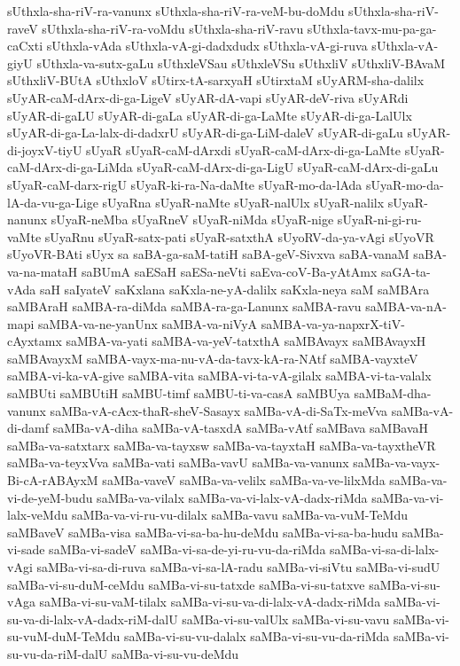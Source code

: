 {sUthxla-sha-riV-ra-vanunx
sUthxla-sha-riV-ra-veM-bu-doMdu
sUthxla-sha-riV-raveV
sUthxla-sha-riV-ra-voMdu
sUthxla-sha-riV-ravu
sUthxla-tavx-mu-pa-ga-caCxti
sUthxla-vAda
sUthxla-vA-gi-dadxdudx
sUthxla-vA-gi-ruva
sUthxla-vA-giyU
sUthxla-va-sutx-gaLu
sUthxleVSau
sUthxleVSu
sUthxliV
sUthxliV-BAvaM
sUthxliV-BUtA
sUthxloV
sUtirx-tA-sarxyaH
sUtirxtaM
sUyARM-sha-dalilx
sUyAR-caM-dArx-di-ga-LigeV
sUyAR-dA-vapi
sUyAR-deV-riva
sUyARdi
sUyAR-di-gaLU
sUyAR-di-gaLa
sUyAR-di-ga-LaMte
sUyAR-di-ga-LalUlx
sUyAR-di-ga-La-lalx-di-dadxrU
sUyAR-di-ga-LiM-daleV
sUyAR-di-gaLu
sUyAR-di-joyxV-tiyU
sUyaR
sUyaR-caM-dArxdi
sUyaR-caM-dArx-di-ga-LaMte
sUyaR-caM-dArx-di-ga-LiMda
sUyaR-caM-dArx-di-ga-LigU
sUyaR-caM-dArx-di-gaLu
sUyaR-caM-darx-rigU
sUyaR-ki-ra-Na-daMte
sUyaR-mo-da-lAda
sUyaR-mo-da-lA-da-vu-ga-Lige
sUyaRna
sUyaR-naMte
sUyaR-nalUlx
sUyaR-nalilx
sUyaR-nanunx
sUyaR-neMba
sUyaRneV
sUyaR-niMda
sUyaR-nige
sUyaR-ni-gi-ru-vaMte
sUyaRnu
sUyaR-satx-pati
sUyaR-satxthA
sUyoRV-da-ya-vAgi
sUyoVR
sUyoVR-BAti
sUyx
sa
saBA-ga-saM-tatiH
saBA-geV-Sivxva
saBA-vanaM
saBA-va-na-mataH
saBUmA
saESaH
saESa-neVti
saEva-coV-Ba-yAtAmx
saGA-ta-vAda
saH
saIyateV
saKxlana
saKxla-ne-yA-dalilx
saKxla-neya
saM
saMBAra
saMBAraH
saMBA-ra-diMda
saMBA-ra-ga-Lanunx
saMBA-ravu
saMBA-va-nA-mapi
saMBA-va-ne-yanUnx
saMBA-va-niVyA
saMBA-va-ya-napxrX-tiV-cAyxtamx
saMBA-va-yati
saMBA-va-yeV-tatxthA
saMBAvayx
saMBAvayxH
saMBAvayxM
saMBA-vayx-ma-nu-vA-da-tavx-kA-ra-NAtf
saMBA-vayxteV
saMBA-vi-ka-vA-give
saMBA-vita
saMBA-vi-ta-vA-gilalx
saMBA-vi-ta-valalx
saMBUti
saMBUtiH
saMBU-timf
saMBU-ti-va-casA
saMBUya
saMBaM-dha-vanunx
saMBa-vA-cAcx-thaR-sheV-Sasayx
saMBa-vA-di-SaTx-meVva
saMBa-vA-di-damf
saMBa-vA-diha
saMBa-vA-tasxdA
saMBa-vAtf
saMBava
saMBavaH
saMBa-va-satxtarx
saMBa-va-tayxsw
saMBa-va-tayxtaH
saMBa-va-tayxtheVR
saMBa-va-teyxVva
saMBa-vati
saMBa-vavU
saMBa-va-vanunx
saMBa-va-vayx-Bi-cA-rABAyxM
saMBa-vaveV
saMBa-va-velilx
saMBa-va-ve-lilxMda
saMBa-va-vi-de-yeM-budu
saMBa-va-vilalx
saMBa-va-vi-lalx-vA-dadx-riMda
saMBa-va-vi-lalx-veMdu
saMBa-va-vi-ru-vu-dilalx
saMBa-vavu
saMBa-va-vuM-TeMdu
saMBaveV
saMBa-visa
saMBa-vi-sa-ba-hu-deMdu
saMBa-vi-sa-ba-hudu
saMBa-vi-sade
saMBa-vi-sadeV
saMBa-vi-sa-de-yi-ru-vu-da-riMda
saMBa-vi-sa-di-lalx-vAgi
saMBa-vi-sa-di-ruva
saMBa-vi-sa-lA-radu
saMBa-vi-siVtu
saMBa-vi-sudU
saMBa-vi-su-duM-ceMdu
saMBa-vi-su-tatxde
saMBa-vi-su-tatxve
saMBa-vi-su-vAga
saMBa-vi-su-vaM-tilalx
saMBa-vi-su-va-di-lalx-vA-dadx-riMda
saMBa-vi-su-va-di-lalx-vA-dadx-riM-dalU
saMBa-vi-su-valUlx
saMBa-vi-su-vavu
saMBa-vi-su-vuM-duM-TeMdu
saMBa-vi-su-vu-dalalx
saMBa-vi-su-vu-da-riMda
saMBa-vi-su-vu-da-riM-dalU
saMBa-vi-su-vu-deMdu
}
